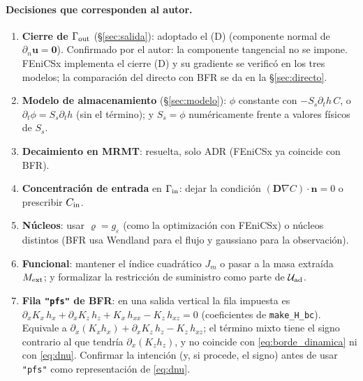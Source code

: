 \documentclass[11pt]{article}
\numberwithin{equation}{section}
\theoremstyle{plain}
\theoremstyle{definition}
\theoremstyle{remark}
\newcommand{\bu}{\mathbf{u}}
\newcommand{\bD}{\mathbf{D}}
\newcommand{\bn}{\mathbf{n}}
\newcommand{\Ceps}{g_\varepsilon}              %
\newcommand{\Nuc}{\varrho}                      %
\begin{document}
\paragraph{Decisiones que corresponden al autor.}
\begin{enumerate}[label=\textbf{D\arabic*.},nosep]
\item \textbf{Cierre de $\Gamma_{\rm out}$} (\S\ref{sec:salida}): adoptado el (D) (componente normal de $\partial_n\bu=\mathbf 0$). Confirmado por el autor: la componente tangencial no se impone. FEniCSx implementa el cierre (D) y su gradiente se verificó en los tres modelos; la comparación del directo con BFR se da en la \S\ref{sec:directo}.
\item \textbf{Modelo de almacenamiento} (\S\ref{sec:modelo}): $\phi$ constante con $-S_s\partial_th\,C$, o $\partial_t\phi=S_s\partial_th$ (sin el término); y $S_s=\phi$ numéricamente frente a valores físicos de $S_s$.
\item \textbf{Decaimiento en MRMT}: resuelta, solo ADR (FEniCSx ya coincide con BFR).
\item \textbf{Concentración de entrada} en $\Gamma_{\rm in}$: dejar la condición $(\bD\nabla C)\cdot\bn=0$ o prescribir $C_{\rm in}$.
\item \textbf{Núcleos}: usar $\Nuc=\Ceps$ (como la optimización con FEniCSx) o núcleos distintos (BFR usa Wendland para el flujo y gaussiano para la observación).
\item \textbf{Funcional}: mantener el índice cuadrático $J_m$ o pasar a la masa extraída $M_{\rm ext}$; y formalizar la restricción de suministro como parte de $\mathcal U_{\rm ad}$.
\item \label{dec:pfs}\textbf{Fila \texttt{"pfs"} de BFR}: en una salida vertical la fila impuesta es $\partial_xK_x\,h_x+\partial_xK_z\,h_z+K_x\,h_{xx}-K_z\,h_{xz}=0$ (coeficientes de \texttt{make\_H\_bc}). Equivale a $\partial_x(K_xh_x)+\partial_xK_z\,h_z-K_z\,h_{xz}$; el término mixto tiene el signo contrario al que
tendría $\partial_x(K_zh_z)$, y no coincide con \eqref{eq:borde_dinamica} ni con \eqref{eq:dnu}. Confirmar la intención (y, si procede, el signo) antes de usar \texttt{"pfs"} como representación de \eqref{eq:dnu}.
\end{enumerate}
\end{document}
